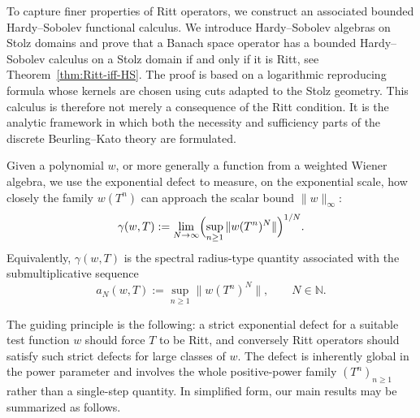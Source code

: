 \documentclass[11pt]{amsart}
\numberwithin{equation}{section}
\theoremstyle{definition}
\theoremstyle{plain}
\begin{document}
To capture finer properties of Ritt operators, we construct an associated bounded
Hardy--Sobolev functional calculus.
We introduce Hardy--Sobolev algebras on Stolz domains and prove that a Banach space operator 
has  a bounded Hardy--Sobolev calculus on a
Stolz domain if and only if it is Ritt, see
Theorem~\ref{thm:Ritt-iff-HS}. The proof is based on a logarithmic reproducing
formula whose kernels are chosen using cuts adapted to the Stolz geometry. This
calculus is therefore not merely a consequence of the Ritt condition. It is the
analytic framework in which both the necessity and sufficiency parts of the
discrete Beurling--Kato theory are formulated.

Given a polynomial \(w\), or more generally a function from a weighted
Wiener algebra, we use the exponential defect to measure, on the
exponential scale, how closely the family \(w(T^n)\) can approach the
scalar bound \(\|w\|_\infty\):
\[
  \gamma(w,T)
  :=
  \lim_{N\to\infty}
  \Bigl(\sup_{n\ge1}\|w(T^n)^N\|\Bigr)^{1/N}.
\]
Equivalently, \(\gamma(w,T)\) is the spectral radius-type quantity
associated with the submultiplicative sequence
\[
  a_N(w,T):=\sup_{n\ge1}\|w(T^n)^N\|,
  \qquad N\in\mathbb N.
\]




The guiding principle is the following: a strict exponential defect for a
suitable test function $w$ should force $T$ to be Ritt, and conversely Ritt
operators should satisfy such strict defects for large classes of $w$. The
defect is inherently global in the power parameter and involves the whole positive-power family
$(T^n)_{n\ge1}$ rather than a single-step quantity. In simplified form, our
main results may be summarized as follows.
\end{document}
